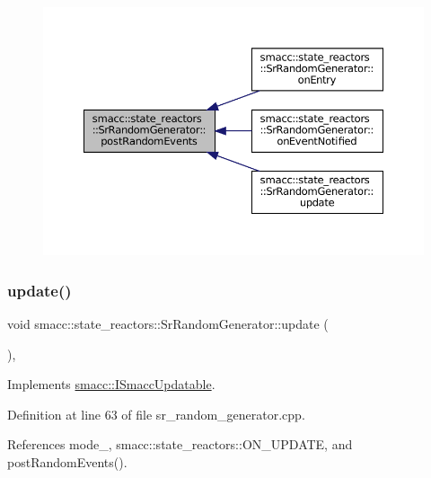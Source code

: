 \begin{figure}[H]
\begin{center}
\leavevmode
\includegraphics[width=350pt]{classsmacc_1_1state__reactors_1_1SrRandomGenerator_a50638c93ca9444fbeecea6e72bc6ac35_icgraph}
\end{center}
\end{figure}
\mbox{\label{classsmacc_1_1state__reactors_1_1SrRandomGenerator_adf6e20208210f30639b92214e1dda83b}} 
\subsubsection{\texorpdfstring{update()}{update()}}
{\footnotesize\ttfamily void smacc\+::state\+\_\+reactors\+::\+Sr\+Random\+Generator\+::update (\begin{DoxyParamCaption}{ }\end{DoxyParamCaption})\hspace{0.3cm}{\ttfamily [override]}, {\ttfamily [virtual]}}



Implements \hyperlink{classsmacc_1_1ISmaccUpdatable_a84ee0520cbefdb1d412bed54650b028e}{smacc\+::\+I\+Smacc\+Updatable}.



Definition at line 63 of file sr\+\_\+random\+\_\+generator.\+cpp.



References mode\+\_\+, smacc\+::state\+\_\+reactors\+::\+O\+N\+\_\+\+U\+P\+D\+A\+TE, and post\+Random\+Events().


